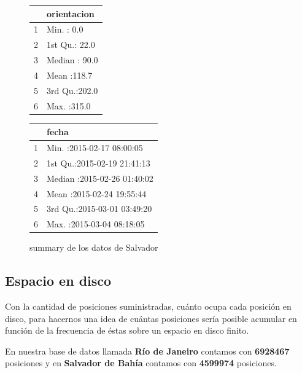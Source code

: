 \documentclass[a4paper, 12pt]{article}
\begin{document}
\begin{figure}

\begin{center}
\begin{minipage}[t]{.3\textwidth}
	\begin{tabular}{rl}
  \hline
 &       orientacion \\ 
  \hline
1 & Min.   :  0.0   \\ 
  2 & 1st Qu.: 22.0   \\ 
  3 & Median : 90.0   \\ 
  4 & Mean   :118.7   \\ 
  5 & 3rd Qu.:202.0   \\ 
  6 & Max.   :315.0   \\ 
   \hline
\end{tabular}
\end{minipage}\hfil
\begin{minipage}[t]{.5\textwidth}
	\begin{tabular}{rl}
  \hline
 &       fecha \\ 
  \hline
1 & Min.   :2015-02-17 08:00:05   \\ 
  2 & 1st Qu.:2015-02-19 21:41:13   \\ 
  3 & Median :2015-02-26 01:40:02   \\ 
  4 & Mean   :2015-02-24 19:55:44   \\ 
  5 & 3rd Qu.:2015-03-01 03:49:20   \\ 
  6 & Max.   :2015-03-04 08:18:05   \\ 
   \hline
\end{tabular}
\end{minipage}
\end{center}
\caption{summary de los datos de Salvador}
\end{figure}


\pagebreak
\subsection{Espacio en disco}

Con la cantidad de posiciones suministradas, cu\'anto ocupa cada posici\'on en disco, para hacernos una idea de cu\'antas posiciones ser\'ia posible acumular en funci\'on de la frecuencia de \'estas sobre un espacio en disco finito.

En nuestra base de datos llamada \textbf{R\'io de Janeiro} contamos con \textbf{6928467} posiciones y en \textbf{Salvador de Bah\'ia} contamos con \textbf{4599974} posiciones.
\end{document}
